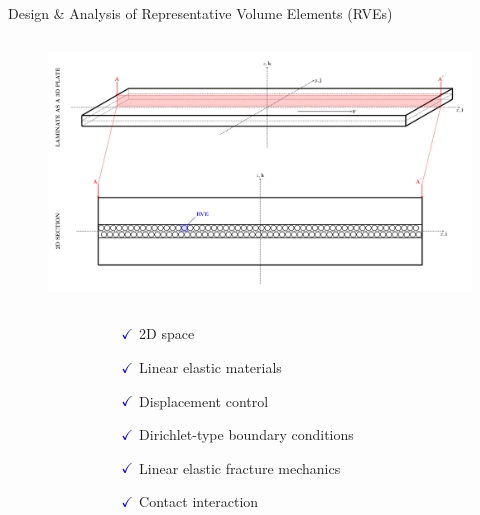 \documentclass[final]{beamer}
\begin{document}
\begin{frame}
\begin{center}
\begin{minipage}{\textwidth}
\begin{exampleblock}{\rule[-0.6ex]{0pt}{50pt}\centering\LARGE Design \& Analysis of Representative Volume Elements (RVEs)}
\begin{columns}
\begin{column}{0.3\textwidth}
\begin{center}
\begin{figure}[!h]
\centering
   \includegraphics[width=\columnwidth]{laminate-section.pdf}
\end{figure}
\begin{columns}
\begin{column}{0.25\columnwidth}
\end{column}
\begin{column}{0.5\columnwidth}
\begin{itemize}
\small
\item[$\color{blue}\checkmark$]2D space
\item[$\color{blue}\checkmark$]Linear elastic materials
\item[$\color{blue}\checkmark$]Displacement control
\item[$\color{blue}\checkmark$]Dirichlet-type boundary conditions
\item[$\color{blue}\checkmark$]Linear elastic fracture mechanics
\item[$\color{blue}\checkmark$]Contact interaction\\[5pt]
\end{itemize}
\end{column}
\begin{column}{0.25\columnwidth}
\end{column}
\end{columns}
\end{center}

\end{column}
\end{columns}
\end{exampleblock}
\end{minipage}
\end{center}
\end{frame}
\end{document}
